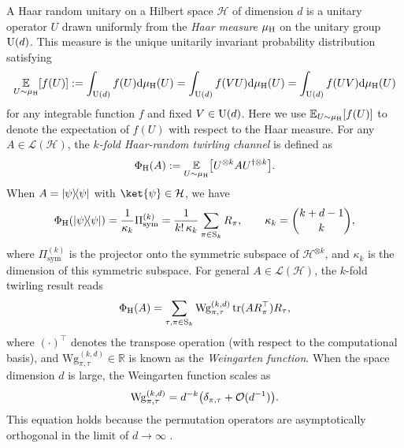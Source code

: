 \documentclass[aps,prl,twocolumn,nofootinbib,superscriptaddress,10pt]{revtex4-2}
\let\originalleft\left
\let\originalright\right
\renewcommand{\left}{\mathopen{}\mathclose\bgroup\originalleft}
\renewcommand{\right}{\aftergroup\egroup\originalright}
\def\E{ {\mathbb E} } %
\newcommand{\ketbra}[2]{\ensuremath{\left|#1\right\rangle\!\left\langle#2\right|}}
\DeclareMathOperator{\Tr}{tr}
\newcommand{\sym}{\Pi_{\operatorname{sym}}}
\theoremstyle{plain}
\theoremstyle{definition}
\newcommand{\caH}{\mathcal{H}}
\newcommand{\Wg}{\mathrm{Wg}}
\begin{document}
A Haar random unitary on a Hilbert space \( \mathcal{H} \) of dimension \( d \) is a unitary operator \( U \) drawn uniformly from the \emph{Haar measure} $\mu_{\rm H}$ on the unitary group \( {\rm U}(d) \). This measure is the unique unitarily invariant probability distribution satisfying 
\begin{align}
\underset{U\sim \mu_{\rm H}}{\E} [f(U)]
:=
\int_{{\rm U}(d)} f(U) {\rm d}\mu_{\rm H}(U) 
= \int_{{\rm U}(d)} f(VU) {\rm d}\mu_{\rm H}(U) 
= \int_{{\rm U}(d)} f(UV) {\rm d}\mu_{\rm H}(U) 
\end{align}
for any integrable function \( f \) and fixed \( V \in {\rm U}(d) \). Here we use ${\E}_{U\sim \mu_{\rm H}} [f(U)]$ to denote the expectation of $f (U )$  with respect to the Haar measure.  
For any $A \in \mathcal{L}(\mathcal{H})$, the \emph{$k$-fold Haar-random twirling channel} is defined as  
\begin{align}\label{eq:twirlingDef}
	\Phi_{\rm H}(A) := \underset{U\sim \mu_{\rm H}}{\E} \left[ U^{\otimes k} A U^{\dagger\otimes k} \right]. 
\end{align}  
When $A=\ketbra{\psi}{\psi}$ with $\ket{\psi}\in\caH$, we have
\begin{align}\label{eq:PhiHaar}
\Phi_{\rm H}(\ketbra{\psi}{\psi})
=\frac{1}{\kappa_k }\Pi_{\mathrm{sym}}^{(k)}
=\frac{1}{ k!\, \kappa_k} \sum_{\pi \in \mathrm{S}_k} R_\pi, 
\qquad
\kappa_k=\binom{k+d-1}{k}, 
\end{align}
where $\sym^{(k)}$ is the projector onto the symmetric subspace of $\caH^{\otimes k}$, 
and $\kappa_k$ is the dimension of this symmetric subspace. 
For general $A \in \mathcal{L}(\mathcal{H})$, the $k$-fold twirling result reads 
\begin{align}\label{eq:tirling}
	\Phi_{\rm H}(A)
	= \sum_{\tau,\pi\in \mathrm{S}_k} \Wg_{\pi,\tau}^{(k,d)}\Tr(A R_{\pi}^{\top})R_{\tau}, 
\end{align}
where $(\cdot)^{\top}$ denotes the transpose operation (with respect to the computational basis), and 
$\Wg_{\pi,\tau}^{(k,d)}\in\mathbb{R}$ is known as the \emph{Weingarten function}. 
When the space dimension $d$ is large, the Weingarten function scales as
\begin{align}\label{eq:Weingarten}
	\Wg_{\pi,\tau}^{(k,d)}=d^{-k}\left(\delta_{\pi, \tau}+\mathcal{O}(d^{-1})\right).
\end{align}
This equation holds because the permutation operators are asymptotically orthogonal in the limit of $d\rightarrow \infty$ \cite{kostenberger2021weingarten,aharonov2022quantum}.
\end{document}
